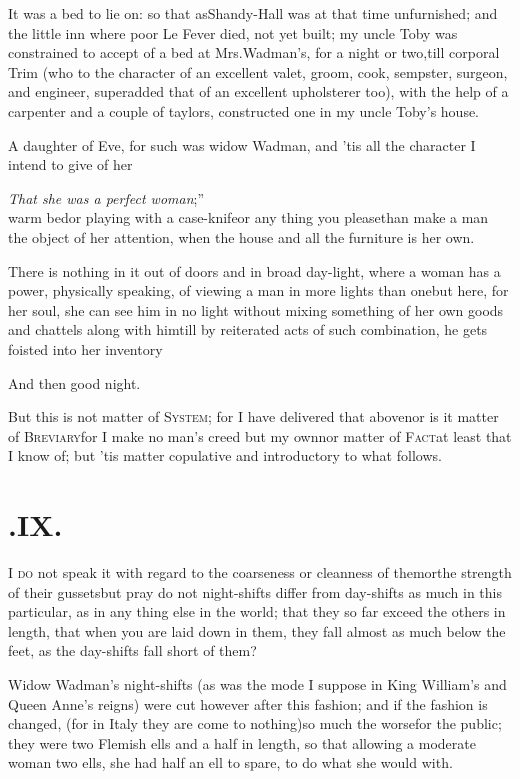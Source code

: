 \documentclass{article}
\begin{document}
\tsh It was a bed to lie on: so that as\break Shandy-Hall was
at that time unfurn\-ish\-ed; and the little inn where poor Le
Fever died, not yet built; my uncle Toby was constrained
to accept of a bed at Mrs.\@ Wadman’s, for a night or
two,\pb till corporal Trim (who to the character of an
excellent valet, groom, cook, sempster, surgeon, and engineer,
superadded that of an excellent upholsterer too), with
the help of a carpenter and a couple of taylors, constructed one in
my uncle Toby’s house.

A daughter of Eve, for such was widow Wadman, and
’tis all the character I intend to give of her\tsk 

\tsk\lqq\textit{That she was a perfect woman};”\\[6pt]
warm bed\tsk or playing with a case-knife\break\tsk or any thing
you please\tsk than make a man the object of her attention,
when\break
the house and all the furniture is her own.

\newpage
There is nothing in it out of doors and in broad day-light,
where a woman has a power, physically speaking, of viewing a man in
more lights than one\tsk but here, for her soul, she can see him
in no light without mixing something of her own goods and chattels
along with him\tsh till by reiterated acts of such
combination, he gets foisted into her inventory\tsh

\tsh And then good night.

But this is not matter of \textsc{System}; for I have
delivered that above\tsh nor is it matter of
\textsc{Breviary}\tsh for I make no man’s
creed but my own\tsh nor matter of
\textsc{Fact}\tsh at least that I know of; but
’tis matter copulative and introductory to what follows.

\section{.\enspace IX.}

\lettrine{I}{ do} not speak it with regard to the
coarseness or cleanness of them\tsh or\break the strength of their
gussets\tsh but pray do not night-shifts differ from
day-shifts as much in this particular, as in any thing else in the
world; that they so far exceed the others in length, that when you
are laid down in them, they fall almost as much below the feet, as
the day-shifts fall short of them?

Widow Wadman’s night-shifts (as was the mode I
suppose in King William’s and Queen
Anne’s reigns) were cut however after this fashion;
and if the fashion is changed, (for in Italy they are come to
nothing)\tsh so much the worse\pb for the public; they were two Flemish ells
and a half in length, so that allowing a moderate woman two ells,
she had half an ell to spare, to do what she would with.
\end{document}
